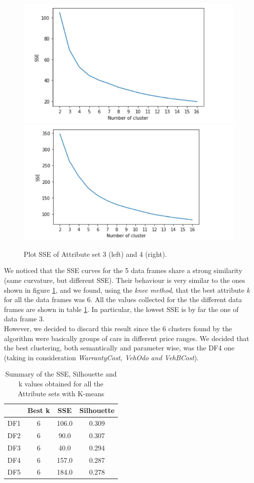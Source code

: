 \documentclass{article}
\begin{document}
	
	\begin{figure}[H]
		\centering
		\includegraphics[width=.49\textwidth]{cattura}\hfill
		\includegraphics[width=.49\textwidth]{SSE2}
		\caption{Plot SSE of Attribute set 3 (left) and 4 (right).}
		\label{fig:KmeansSSE}
	\end{figure}
	We noticed that the SSE curves for the 5 data frames share a strong similarity (same curvature, but different SSE). Their behaviour is very similar to the ones shown in figure \ref{fig:KmeansSSE}, and we found, using the \emph{knee method}, that the best attribute \emph{k} for all the data frames was 6. All the values collected for the the different data frames are shown in table \ref{tab:SSESilu}. In particular, the lowest SSE is by far the one of data frame 3. \\However, we decided to discard this result since the 6 clusters found by the algorithm were basically groups of cars in different price ranges. We decided that the best clustering, both semantically and parameter wise, was the DF4 one (taking in consideration \emph{WarrantyCost, VehOdo and VehBCost}).
	
	\begin{table}[H]
		\centering
		\begin{tabular}{|c|ccc|}
			\hline
			&  Best k & SSE& Silhouette \\
			\hline
			\rowcolor{Gray}
			DF1 & 6 & 106.0 & 0.309 \\
			DF2 & 6 & 90.0 & 0.307  \\
			\rowcolor{Gray}
			DF3 & 6 & 40.0 & 0.294 \\
			DF4 & 6 & 157.0 & 0.287  \\
			\rowcolor{Gray}
			DF5 & 6 & 184.0\textbf & 0.278 \\
			\hline
		\end{tabular}
		\caption{{ Summary of the SSE, Silhouette and k values obtained for all the Attribute sets with K-means}}
		\label{tab:SSESilu}
	\end{table}
	
\end{document}
